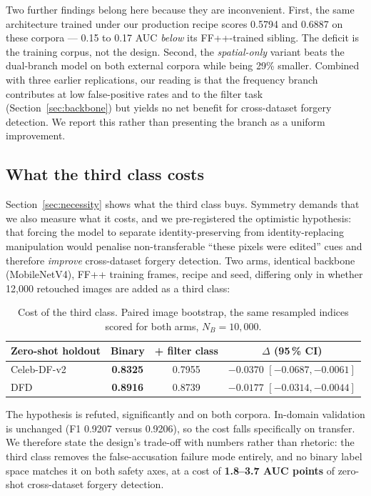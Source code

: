 \documentclass[conference]{IEEEtran}
\begin{document}
Two further findings belong here because they are inconvenient. First, the same architecture
trained under our production recipe scores 0.5794 and 0.6887 on these corpora --- 0.15 to 0.17
AUC \emph{below} its FF++-trained sibling. The deficit is the training corpus, not the design.
Second, the \emph{spatial-only} variant beats the dual-branch model on both external corpora
while being 29\% smaller. Combined with three earlier replications, our reading is that the
frequency branch contributes at low false-positive rates and to the filter task
(Section~\ref{sec:backbone}) but yields no net benefit for cross-dataset forgery detection.
We report this rather than presenting the branch as a uniform improvement.

\subsection{What the third class costs}
\label{sec:auxcost}
Section~\ref{sec:necessity} shows what the third class buys. Symmetry demands that we also
measure what it costs, and we pre-registered the optimistic hypothesis: that forcing the model
to separate identity-preserving from identity-replacing manipulation would penalise
non-transferable ``these pixels were edited'' cues and therefore \emph{improve} cross-dataset
forgery detection. Two arms, identical backbone (MobileNetV4), FF++ training frames, recipe
and seed, differing only in whether 12{,}000 retouched images are added as a third class:

\begin{table}[t]
\caption{Cost of the third class. Paired image bootstrap, the same resampled indices scored
for both arms, $N_B = 10{,}000$.}
\label{tab:auxcost}
\centering\small
\begin{tabular}{@{}lccc@{}}
\toprule
Zero-shot holdout & Binary & + filter class & $\Delta$ (95\,\% CI) \\
\midrule
Celeb-DF-v2 & \textbf{0.8325} & 0.7955 & $-0.0370$ $[-0.0687, -0.0061]$ \\
DFD & \textbf{0.8916} & 0.8739 & $-0.0177$ $[-0.0314, -0.0044]$ \\
\bottomrule
\end{tabular}
\end{table}

The hypothesis is refuted, significantly and on both corpora. In-domain validation is
unchanged (F1 0.9207 versus 0.9206), so the cost falls specifically on transfer. We therefore
state the design's trade-off with numbers rather than rhetoric: the third class removes the
false-accusation failure mode entirely, and no binary label space matches it on both safety
axes, at a cost of \textbf{1.8--3.7 AUC points} of zero-shot cross-dataset forgery detection.
\end{document}
